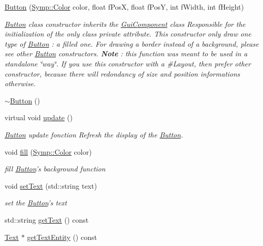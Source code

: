 \begin{DoxyCompactItemize}
\hyperlink{class_symp_1_1_button_ac9ef62333a52cb81e76dbda11d26ee32}{Button} (\hyperlink{struct_symp_1_1_color}{Symp\-::\-Color} color, float f\-Pos\-X, float f\-Pos\-Y, int f\-Width, int f\-Height)
\begin{DoxyCompactList}\small\item\em \hyperlink{class_symp_1_1_button}{Button} class constructor inherits the \hyperlink{class_symp_1_1_gui_component}{Gui\-Component} class Responsible for the initialization of the only class private attribute. This constructor only draw one type of \hyperlink{class_symp_1_1_button_a2de1604451d582a7c2e22344305212e5}{Button} \-: a filled one. For drawing a border instead of a background, please see other \hyperlink{class_symp_1_1_button_a2de1604451d582a7c2e22344305212e5}{Button} constructors. {\bfseries Note} \-: this function was meant to be used in a standalone \char`\"{}way\char`\"{}. If you use this constructor with a \#\-Layout, then prefer other constructor, because there will redondancy of size and position informations otherwise. \end{DoxyCompactList}\item 
\hyperlink{class_symp_1_1_button_a447d8e03240d9c19a421c392aff9cd5b}{$\sim$\-Button} ()
\item 
virtual void \hyperlink{class_symp_1_1_button_a5cec3a7ede8af0c059d6430f971b276b}{update} ()
\begin{DoxyCompactList}\small\item\em \hyperlink{class_symp_1_1_button}{Button} update fonction Refresh the display of the \hyperlink{class_symp_1_1_button_a2de1604451d582a7c2e22344305212e5}{Button}. \end{DoxyCompactList}\item 
void \hyperlink{class_symp_1_1_button_a926c42a1754990a32d4e9ed0f0ac17ff}{fill} (\hyperlink{struct_symp_1_1_color}{Symp\-::\-Color} color)
\begin{DoxyCompactList}\small\item\em fill \hyperlink{class_symp_1_1_button}{Button}'s background function \end{DoxyCompactList}\item 
void \hyperlink{class_symp_1_1_button_a44df5d198c51903edec0ed94ef494674}{set\-Text} (std\-::string text)
\begin{DoxyCompactList}\small\item\em set the \hyperlink{class_symp_1_1_button}{Button}'s text \end{DoxyCompactList}\item 
std\-::string \hyperlink{class_symp_1_1_button_ad468381ce32ed90c3b8c4bb5412fde34}{get\-Text} () const 
\item 
\hyperlink{class_symp_1_1_text}{Text} $\ast$ \hyperlink{class_symp_1_1_button_ab686da4fd7b76aebc4f674db8b368a52}{get\-Text\-Entity} () const 
\end{DoxyCompactItemize}
